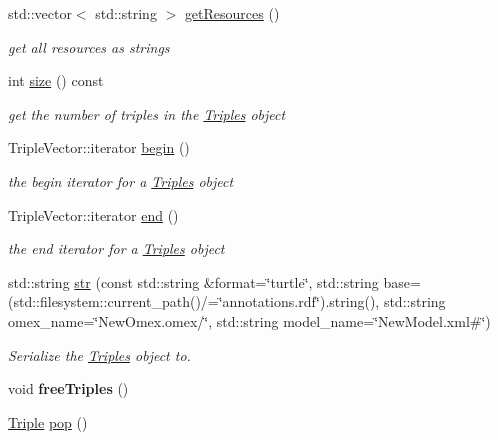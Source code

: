 \begin{DoxyCompactItemize}
std\+::vector$<$ std\+::string $>$ \hyperlink{classomexmeta_1_1Triples_aa875120a73cb1618be9e699e8bfb08c4}{get\+Resources} ()
\begin{DoxyCompactList}\small\item\em get all resources as strings \end{DoxyCompactList}\item 
int \hyperlink{classomexmeta_1_1Triples_adc86427b3563d04849336a8da7566451}{size} () const
\begin{DoxyCompactList}\small\item\em get the number of triples in the \hyperlink{classomexmeta_1_1Triples}{Triples} object \end{DoxyCompactList}\item 
Triple\+Vector\+::iterator \hyperlink{classomexmeta_1_1Triples_aa6735eb506ff0d5a3179fab3af3b2602}{begin} ()
\begin{DoxyCompactList}\small\item\em the begin iterator for a \hyperlink{classomexmeta_1_1Triples}{Triples} object \end{DoxyCompactList}\item 
Triple\+Vector\+::iterator \hyperlink{classomexmeta_1_1Triples_a4312337b242280bcb119908c0334bfd8}{end} ()
\begin{DoxyCompactList}\small\item\em the end iterator for a \hyperlink{classomexmeta_1_1Triples}{Triples} object \end{DoxyCompactList}\item 
std\+::string \hyperlink{classomexmeta_1_1Triples_ad2510c5b335b0266b05507c53bcc64af}{str} (const std\+::string \&format=\char`\"{}turtle\char`\"{}, std\+::string base=(std\+::filesystem\+::current\+\_\+path()/=\char`\"{}annotations.\+rdf\char`\"{}).string(), std\+::string omex\+\_\+name=\char`\"{}New\+Omex.\+omex/\char`\"{}, std\+::string model\+\_\+name=\char`\"{}New\+Model.\+xml\#\char`\"{})
\begin{DoxyCompactList}\small\item\em Serialize the \hyperlink{classomexmeta_1_1Triples}{Triples} object to. \end{DoxyCompactList}\item 
\mbox{\label{classomexmeta_1_1Triples_ad0c5839b0f49d6427cf53004baf9b0f4}} 
void {\bfseries free\+Triples} ()
\item 
\hyperlink{classomexmeta_1_1Triple}{Triple} \hyperlink{classomexmeta_1_1Triples_a5dad8f2cde0a3f6c0ce341338f80b0cd}{pop} ()

\end{DoxyCompactItemize}

